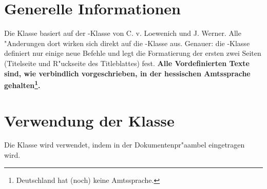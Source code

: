 \documentclass[article,dr=phil,type=drfinal,colorback,accentcolor=tud9c]{tudthesis}
\begin{document}
 
 
  \section{Generelle Informationen}
    Die Klasse basiert auf der -Klasse von C. v. Loewenich und
    J. Werner. Alle "Anderungen dort wirken sich direkt auf die
    -Klasse aus. Genauer: die -Klasse definiert nur einige
    neue Befehle und legt die Formatierung der ersten zwei Seiten (Titelseite
    und R"uckseite des Titleblattes) fest. \textbf{Alle Vordefinierten Texte sind, wie verbindlich vorgeschrieben, in der hessischen Amtssprache
    gehalten\footnote{Deutschland hat (noch) keine Amtssprache.}.}

  \section{Verwendung der Klasse}
    Die Klasse wird verwendet, indem in der Dokumentenpr"aambel
    eingetragen wird.

 
\end{document}
